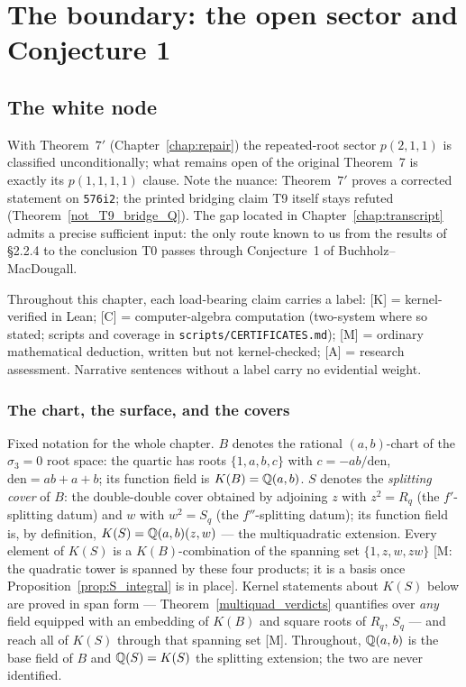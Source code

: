 \chapter{The boundary: the open sector and Conjecture 1}\label{chap:boundary}

\section{The white node}

With Theorem~$7'$ (Chapter~\ref{chap:repair}) the repeated-root sector $p(2,1,1)$ is classified unconditionally; what remains open of the original Theorem~7 is exactly its $p(1,1,1,1)$ clause. Note the nuance: Theorem~$7'$ proves a corrected statement on \texttt{576i2}; the printed bridging claim T9 itself stays refuted (Theorem~\ref{not_T9_bridge_Q}). The gap located in Chapter~\ref{chap:transcript} admits a precise sufficient input: the only
route known to us from the results of \S2.2.4 to the conclusion T0 passes through
Conjecture~1 of Buchholz--MacDougall.

Throughout this chapter, each load-bearing claim carries a label: [K] =
kernel-verified in Lean; [C] = computer-algebra computation (two-system where so
stated; scripts and coverage in \texttt{scripts/CERTIFICATES.md}); [M] = ordinary
mathematical deduction, written but not kernel-checked; [A] = research assessment.
Narrative sentences without a label carry no evidential weight.

\subsection*{The chart, the surface, and the covers}
Fixed notation for the whole chapter.  $B$ denotes the rational $(a,b)$-chart of
the $\sigma_{3}=0$ root space: the quartic has roots $\{1,a,b,c\}$ with
$c=-ab/\mathrm{den}$, $\mathrm{den}=ab+a+b$; its function field is
$K(B)=\mathbb{Q}(a,b)$.  $S$ denotes the \emph{splitting cover} of $B$: the double-double
cover obtained by adjoining $z$ with $z^{2}=R_{q}$ (the $f'$-splitting datum) and
$w$ with $w^{2}=S_{q}$ (the $f''$-splitting datum); its function field is, by
definition, $K(S)=\mathbb{Q}(a,b)(z,w)$ --- the multiquadratic extension.  Every element
of $K(S)$ is a $K(B)$-combination of the spanning set $\{1,z,w,zw\}$ [M: the quadratic tower is
spanned by these four products; it is a basis once Proposition~\ref{prop:S_integral}
is in place].  Kernel statements about $K(S)$ below are proved in span
form --- Theorem~\ref{multiquad_verdicts} quantifies over \emph{any} field
equipped with an embedding of $K(B)$ and square roots of $R_{q}$, $S_{q}$ --- and
reach all of $K(S)$ through that spanning set [M].  Throughout, $\mathbb{Q}(a,b)$ is the base
field of $B$ and $\mathbb{Q}(S)=K(S)$ the splitting extension; the two are never
identified.

